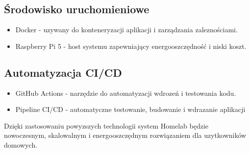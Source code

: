 \subsection{Środowisko uruchomieniowe}
\begin{itemize}
    \item Docker - uzywany do konteneryzacji aplikacji i zarządzania zaleznościami.
    \item Raspberry Pi 5 - host systemu zapewniający energooszczędność i niski koszt.
\end{itemize}
\subsection{Automatyzacja CI/CD}
\begin{itemize}
    \item GitHub Actions - narzędzie do automatyzacji wdrozeń i testowania kodu.
    \item Pipeline CI/CD - automatyczne testowanie, budowanie i wdrazanie aplikacji
\end{itemize}

Dzięki zastosowaniu powyzszych technologii system Homelab będzie nowoczesnym, skalowalnym i energooszczędnym rozwiązaniem dla uzytkowników domowych.